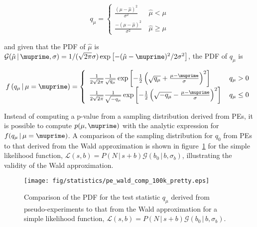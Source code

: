 \begin{equation}
q_{\mu} = \left\{
\begin{array}{ll}
\frac{\left(\mu-\hat{\mu}\right)^2}{\sigma^2} & \, \hat{\mu} < \mu \\
\frac{-\left(\mu-\hat{\mu}\right)^2}{\sigma^2} & \, \hat{\mu} \geq \mu
\end{array}
\right.
\label{chapter:statistics:equation:qmu_wald}
\end{equation}

\noindent
and given that the PDF of $\hat{\mu}$ is $\mathcal{G}(\hat{\mu}\,|\,\muprime,\sigma)
= 1/(\sqrt{2\pi}\sigma)\exp{\left[-(\hat{\mu}-\muprime)^2/2\sigma^2\right]}$, the
PDF of $q_{\mu}$ is

\begin{equation}
f\left(q_{\mu}\,|\,\mu = \muprime\right) = \left\{
\begin{array}{ll}
\frac{1}{2\sqrt{2\pi}}\frac{1}{\sqrt{q_{\mu}}}\exp{\left[-\frac{1}{2}\left(
    \sqrt{q_{\mu}} + \frac{\mu - \muprime}{\sigma} \right)^2\right]} & \, q_{\mu} > 0 \\
\frac{1}{2\sqrt{2\pi}}\frac{1}{\sqrt{-q_{\mu}}}\exp{\left[-\frac{1}{2}\left(\sqrt{-q_{\mu}}
    - \frac{\mu - \muprime}{\sigma} \right)^2\right]} & \, q_{\mu} \leq 0
\end{array}
\right.
\label{chapter:statistics:equation:pdf_qmu}
\end{equation}

\noindent
Instead of computing a p-value from a sampling distribution derived
from PEs, it is possible to compute $p(\mu,\muprime)$ with the
analytic expression for $f(q_{\mu}\,|\,\mu = \muprime)$. A comparison of
the sampling distribution for $q_0$ from PEs to that derived from the
Wald approximation is shown
in figure~\ref{chap:statistics:fig:f_qmu_PE_wald} for the simple likelihood function, $\mathscr{L}(s,b) =
P(N\,|\,s+b)\mathcal{G}(b_0\,|\,b,\sigma_b)$, illustrating the validity of the
Wald approximation. 

\begin{figure}
\centering
\texttt{[image: fig/statistics/pe\_wald\_comp\_100k\_pretty.eps]}
\caption{Comparison of the PDF for the test statistic $q_{\mu}$
derived from pseudo-experiments to that from the Wald approximation
for a simple likelihood function, $\mathscr{L}(s,b) =
P(N\,|\,s+b)\mathcal{G}(b_0\,|\,b,\sigma_b)$. }
\label{chap:statistics:fig:f_qmu_PE_wald}
\end{figure}

